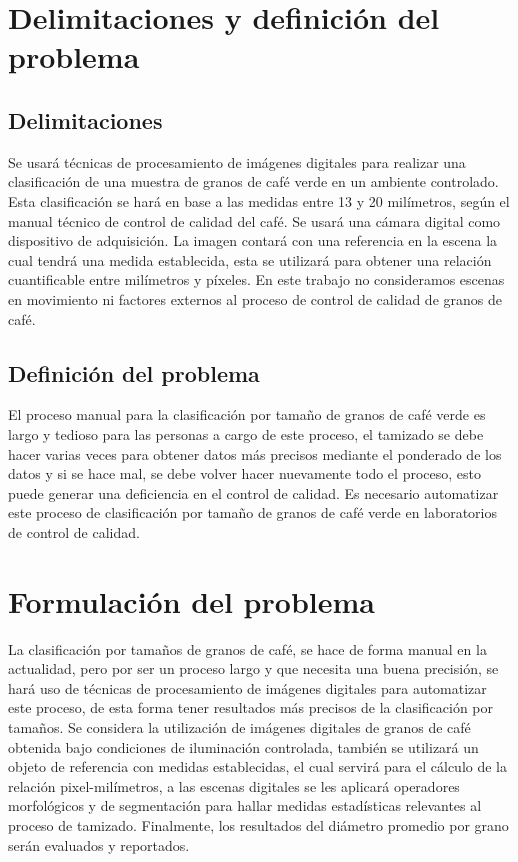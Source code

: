 \documentclass[12pt,a4paper,oneside]{book}
\begin{document}
\section{Delimitaciones y definición del problema}

\subsection{Delimitaciones}
Se usará técnicas de procesamiento de imágenes digitales para realizar una clasificación de una muestra de granos de café verde en un ambiente controlado. Esta clasificación se hará en base a las medidas entre 13 y 20 milímetros, según el manual técnico de control de calidad del café. Se usará una cámara digital como dispositivo de adquisición. La imagen contará con una referencia en la escena la cual tendrá una medida establecida, esta se utilizará para obtener una relación cuantificable entre milímetros y píxeles. En este trabajo no consideramos escenas en movimiento ni factores externos al proceso de control de calidad de granos de café.

\subsection{Definición del problema}
El proceso manual para la clasificación por tamaño de granos de café verde es largo y tedioso para las personas a cargo de este proceso, el tamizado se debe hacer varias veces para obtener datos más precisos mediante el ponderado de los datos y si se hace mal, se debe volver hacer nuevamente todo el proceso, esto puede generar una deficiencia en el control de calidad. Es necesario automatizar este proceso de clasificación por tamaño de granos de café verde en laboratorios de control de calidad.

\section{Formulación del problema}
La clasificación por tamaños de granos de café, se hace de forma manual en la actualidad, pero por ser un proceso largo y que necesita una buena precisión, se hará uso de técnicas de procesamiento de imágenes digitales para automatizar este proceso, de esta forma tener resultados más precisos de la clasificación por tamaños. Se considera la utilización de imágenes digitales de granos de café obtenida bajo condiciones de iluminación controlada, también se utilizará un objeto de referencia con medidas establecidas, el cual servirá para el cálculo de la relación pixel-milímetros, a las escenas digitales se les aplicará operadores morfológicos y de segmentación para hallar medidas estadísticas relevantes al proceso de tamizado. Finalmente, los resultados del diámetro promedio por grano serán evaluados y reportados.
\end{document}
